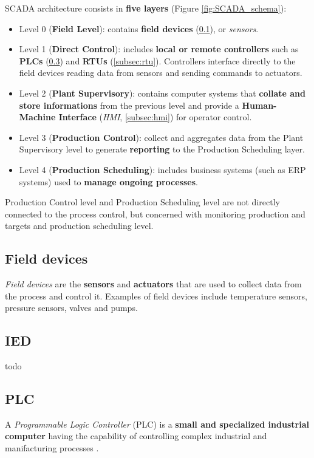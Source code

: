 SCADA architecture consists in \textbf{five layers} (Figure \ref{fig:SCADA_schema}):

\begin{itemize}
	\item Level 0 (\textbf{Field Level}): contains \textbf{field devices} (\ref{subsec:field_devs}), or \textit{sensors}.
	\item Level 1 (\textbf{Direct Control}): includes \textbf{local or remote controllers} such as \textbf{PLCs} (\ref{subsec:plc}) and \textbf{RTUs} (\ref{subsec:rtu}). Controllers interface directly to the field devices reading data from sensors and sending commands to actuators.
	\item Level 2 (\textbf{Plant Supervisory}): contains computer systems that \textbf{collate and store informations} from the previous level and provide a \textbf{Human-Machine Interface} (\textit{HMI}, \ref{subsec:hmi}) for operator control.
	\item Level 3 (\textbf{Production Control}): collect and aggregates data from the Plant Supervisory level to generate \textbf{reporting} to the Production Scheduling layer.
	\item Level 4 (\textbf{Production Scheduling}): includes business systems (such as ERP systems) used to \textbf{manage ongoing processes}.
\end{itemize}

Production Control level and Production Scheduling level are not directly connected to the process control, but concerned with monitoring production and targets and production scheduling level.

\subsection{Field devices}
\label{subsec:field_devs}
\textit{Field devices} are the \textbf{sensors} and \textbf{actuators} that are used to collect data from the process and control it. Examples of field devices include temperature sensors, pressure sensors, valves and pumps.

\subsection{IED} 
todo

\subsection{PLC}
\label{subsec:plc}
A \textit{Programmable Logic Controller} (PLC) is a \textbf{small and specialized industrial computer} having the capability of controlling complex industrial and manifacturing processes \cite{plc_definition}.

